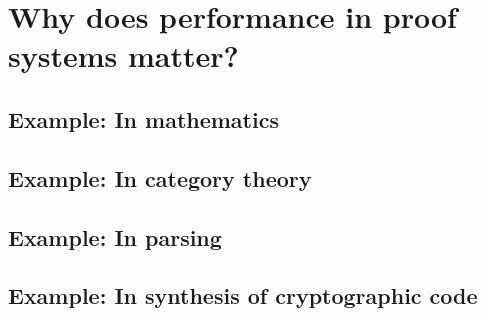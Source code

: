 \chapter{Why does performance in proof systems matter?} \label{ch:motivation} \label{ch:why-perf-matters}



\section{Example: In mathematics}

\section{Example: In category theory}


\section{Example: In parsing}

\section{Example: In synthesis of cryptographic code}
